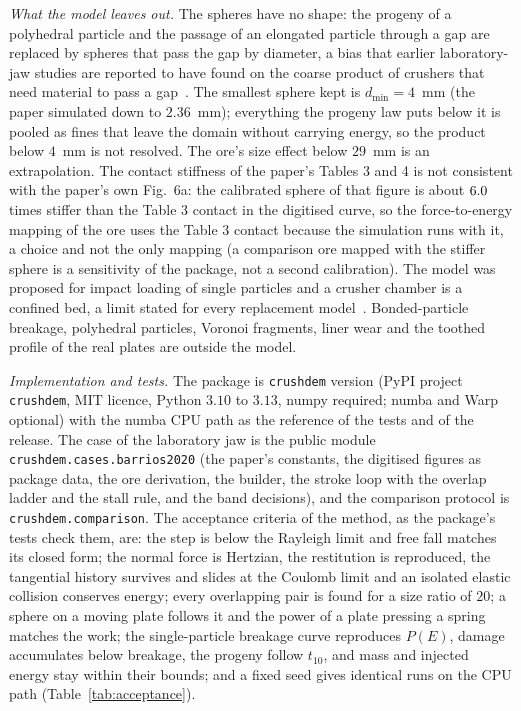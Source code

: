\emph{What the model leaves out.} The spheres have no shape: the progeny of a polyhedral particle and the passage of an elongated particle through a gap are replaced by spheres that pass the gap by diameter, a bias that earlier laboratory-jaw studies are reported to have found on the coarse product of crushers that need material to pass a gap~\cite{tino2026}. The smallest sphere kept is $d_{\min}=4$~mm (the paper simulated down to $2.36$~mm); everything the progeny law puts below it is pooled as fines
that leave the domain without carrying energy, so the product below $4$~mm is not resolved. The ore's size effect below $29$~mm is an extrapolation. The contact stiffness of the paper's Tables 3 and 4 is not consistent with the paper's own Fig.~6a: the calibrated sphere of that figure is about $6.0$ times stiffer than the Table 3 contact in the digitised curve, so the force-to-energy mapping of the ore uses the Table 3 contact because the
simulation runs with it, a choice and not the only mapping (a comparison ore mapped with the stiffer sphere is a sensitivity of the package, not a second calibration). The model was proposed for impact loading of single particles and a crusher chamber is a confined bed, a limit stated for every replacement model~\cite{tavares2022}. Bonded-particle breakage, polyhedral particles, Voronoi fragments, liner wear and
the toothed profile of the real plates are outside the model.

\emph{Implementation and tests.} The package is \texttt{crushdem} version \demPackageVersion{} (PyPI project \texttt{crushdem}, MIT licence, Python $3.10$ to $3.13$, numpy required; numba and Warp optional) with the numba CPU path as the reference of the tests and of the release. The case of the laboratory jaw is the public module \texttt{crushdem.cases.barrios2020} (the paper's constants, the digitised figures as package data, the ore derivation, the builder, the stroke loop with the overlap ladder and the stall rule, and
the band decisions), and the comparison protocol is \texttt{crushdem.comparison}. The acceptance criteria of the method, as the package's tests check them, are: the step is below the Rayleigh limit and free fall matches its closed form; the normal force is Hertzian, the restitution is reproduced, the tangential history survives and slides at the Coulomb limit and an isolated elastic collision conserves energy;
every overlapping pair is found for a size ratio of $20$; a sphere on a moving plate follows it and the power of a plate pressing a spring matches the work; the single-particle breakage curve reproduces $P(E)$, damage accumulates below breakage, the progeny follow $t_{10}$, and mass and injected energy stay within their bounds; and a fixed seed gives identical runs on the CPU path (Table~\ref{tab:acceptance}).

